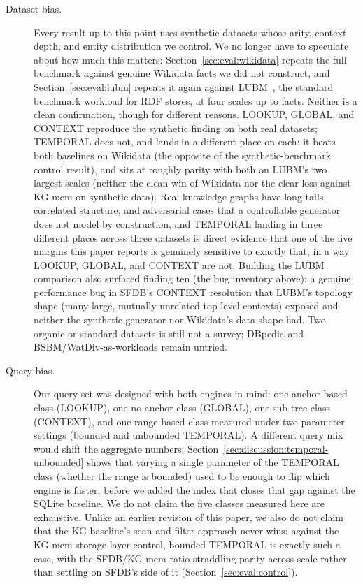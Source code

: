 \begin{description}
    \item[Dataset bias.] Every result up to this point uses synthetic
          datasets whose arity, context depth, and entity distribution we
          control. We no longer have to speculate about how much this
          matters: Section~\ref{sec:eval:wikidata} repeats the full
          benchmark against \wikidatanumfacts{} genuine Wikidata facts we
          did not construct, and Section~\ref{sec:eval:lubm} repeats it
          again against LUBM~\cite{guo2005lubm}, the standard benchmark
          workload for RDF stores, at four scales up to \lubmlargescale{}
          facts. Neither is a clean confirmation, though for different
          reasons. LOOKUP, GLOBAL, and CONTEXT reproduce the synthetic
          finding on both real datasets; TEMPORAL does not, and lands in a
          different place on each: it beats both baselines on Wikidata
          (the opposite of the synthetic-benchmark control result), and
          sits at roughly parity with both on LUBM's two largest scales
          (neither the clean win of Wikidata nor the clear loss against
          KG-mem on synthetic data). Real knowledge graphs have long
          tails, correlated structure, and adversarial cases that a
          controllable generator does not model by construction, and
          TEMPORAL landing in three different places across three
          datasets is direct evidence that one of the five
          margins this paper reports is genuinely sensitive to exactly
          that, in a way LOOKUP, GLOBAL, and CONTEXT are not. Building the
          LUBM comparison also surfaced finding ten (the bug inventory
          above): a genuine performance bug in SFDB's CONTEXT resolution
          that LUBM's topology shape (many large, mutually unrelated
          top-level contexts) exposed and neither the synthetic generator
          nor Wikidata's data shape had. Two organic-or-standard datasets
          is still not a survey; DBpedia and BSBM/WatDiv-as-workloads
          remain untried.

    \item[Query bias.] Our query set was designed with both engines in
          mind: one anchor-based class (LOOKUP), one no-anchor class
          (GLOBAL), one sub-tree class (CONTEXT), and one range-based class
          measured under two parameter
          settings (bounded and unbounded TEMPORAL). A different query mix
          would shift the aggregate numbers; Section~\ref{sec:discussion:temporal-unbounded}
          shows that varying a single parameter of the TEMPORAL class
          (whether the range is bounded) used to be enough to flip which
          engine is faster, before we added the index that closes that gap
          against the SQLite baseline. We do not claim the five classes
          measured here are exhaustive. Unlike an earlier revision of this
          paper, we also do not claim that the KG baseline's scan-and-filter
          approach never wins: against the KG-mem storage-layer control,
          bounded TEMPORAL is exactly such a case, with the SFDB/KG-mem
          ratio straddling parity across scale rather than settling on
          SFDB's side of it (Section~\ref{sec:eval:control}).


\end{description}
